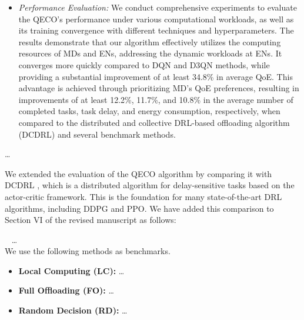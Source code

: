 \documentclass[12pt,draftclsnofoot,onecolumn]{IEEEtran}
\newcommand{\rev}[1]{{\color{blue}#1}} %
\newcommand{\rev}[1]{#1}
\newenvironment{my}[2]%
{\begin{list}{}%
{\setlength{\rightmargin}{#1}\setlength{\leftmargin}{#2}}%


 \item[]{}

} {\end{list}}
\begin{document}
\begin{enumerate}
\begin{my}{1cm}{1cm}
{\begin{itemize}
			
			\item \textit{Performance Evaluation:} We conduct comprehensive experiments to evaluate the QECO's performance under various computational workloads, as well as its training convergence with different techniques and hyperparameters. The results demonstrate that our algorithm effectively utilizes the computing resources of MDs and ENs, addressing the dynamic workloads at ENs. It converges more quickly compared to DQN and D3QN methods, while providing a substantial improvement of at least 34.8\% in average QoE. This advantage is achieved through prioritizing MD's QoE preferences, resulting in improvements of at least 12.2\%, 11.7\%, and 10.8\% in the average number of completed tasks, task delay, and energy consumption, respectively, when compared to the distributed and collective DRL-based offloading algorithm (DCDRL) \cite{qiu2020distributed} and several benchmark methods.
			
			
		\end{itemize}
		

\dots

		
	}


\end{my} \vspace{6mm}


We extended the evaluation of the QECO algorithm by comparing it with DCDRL \cite{qiu2020distributed}, which is a distributed algorithm for delay-sensitive tasks based on the actor-critic framework. This is the foundation for many state-of-the-art DRL algorithms, including DDPG and PPO. We have added this comparison to Section VI of the revised manuscript as follows: \newline 


\begin{my}{1cm}{1cm}
	\rev{
		{\
			\color{black}
			\hspace{-10mm}  \dots \\ We use the following methods as benchmarks.
			\begin{itemize}
				
				\item \textbf{Local Computing (LC):} \dots\vspace{1mm}
				
				\item \textbf{Full Offloading (FO):} \dots\vspace{1mm}
				
				\item \textbf{Random Decision (RD):} \dots\vspace{1mm}
				

\end{itemize}}}
\end{my}
\end{enumerate}
\end{document}
